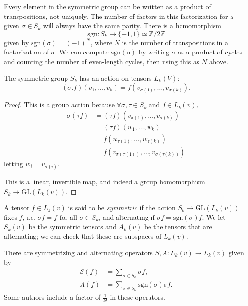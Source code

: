 Every element in the symmetric group can be written as a product of
transpositions, not uniquely. The number of factors in this
factorization for a given $\sigma \in S_k$ will always have the same
parity. There is a homomorphism
$$
       \mathrm{sgn} : S_k
\to    \{-1, 1\}
\simeq \mathbb{Z} / 2\mathbb{Z}
$$
given by $\mathrm{sgn}(\sigma) = (-1)^{N}$, where $N$ is the number of
transpositions in a factorization of $\sigma$. We can compute
$\mathrm{sgn}(\sigma)$ by writing $\sigma$ as a product of cycles and
counting the number of even-length cycles, then using this as $N$
above.

\begin{lemma}
The symmetric group $S_k$ has an action on tensors $L_k(V)$:
$$
  (\sigma . f)(v_1, \dots, v_k)
= f(v_{\sigma(1)}, \dots, v_{\sigma(k)}).
$$
\end{lemma}
\begin{proof}
This is a group action because $\forall \sigma, \tau \in S_k$ and
$f \in L_k(v)$,
\begin{align*}
   \sigma (\tau f)
&= (\tau f)(v_{\sigma(1)}, \dots, v_{\sigma(k)}) \\
&= (\tau f)(w_1, \dots, w_k) \\
&= f(w_{\tau(1)}, \dots, w_{\tau(k)}) \\
&= f(v_{\sigma(\tau(1))}, \dots, v_{\sigma(\tau(k))})
\end{align*}
letting $w_i = v_{\sigma(i)}$.

This is a linear, invertible map, and indeed a group homomorphism
$S_k \to \mathrm{GL}(L_k(v))$.
\end{proof}

\begin{defn}
A tensor $f \in L_k(v)$ is said to be \emph{symmetric} if the action
$S_k \to \mathrm{GL}(L_k(v))$ fixes $f$, i.e. $\sigma f = f$ for all
$\sigma \in S_k$, and alternating if
$\sigma f = \mathrm{sgn}(\sigma)f$. We let $S_k(v)$ be the symmetric
tensors and $A_k(v)$ be the tensors that are alternating; we can check
that these are subspaces of $L_k(v)$.

There are symmetrizing and alternating operators
$S, A: L_k(v) \to L_k(v)$ given by
\begin{align*}
   S(f)
&= \sum_{\sigma \in S_k}
     \sigma f, \\
   A(f)
&= \sum_{\sigma \in S_k}
     \mathrm{sgn}(\sigma)
     \sigma f.
\end{align*}
Some authors include a factor of $\frac{1}{k!}$ in these operators.
\end{defn}

